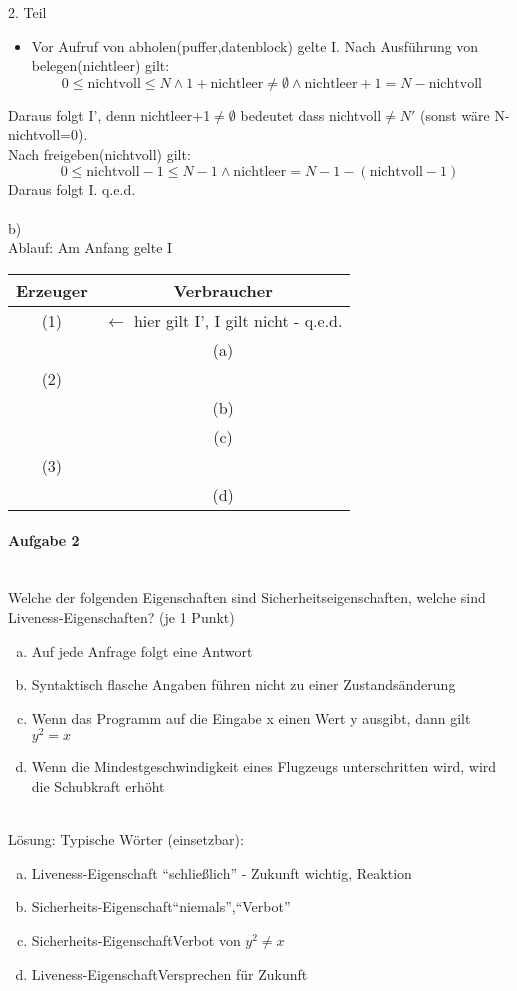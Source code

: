 \documentclass[a4paper,12pt]{scrartcl}
\begin{document}
  2. Teil
  \begin{itemize}
   \item Vor Aufruf von abholen(puffer,datenblock) gelte I. Nach Ausführung von belegen(nichtleer) gilt:
   $$0\leq\text{nichtvoll}\leq N\wedge1+\text{nichtleer}\neq\emptyset\wedge\text{nichtleer}+1=N-\text{nichtvoll} $$
  \end{itemize}
  Daraus folgt I', denn nichtleer+1$\neq\emptyset$ bedeutet dass nichtvoll$\neq N'$ (sonst wäre N-nichtvoll=0).\\
  Nach freigeben(nichtvoll) gilt: 
  $$0\leq \text{nichtvoll}-1\leq N-1\wedge \text{nichtleer}=N-1-(\text{nichtvoll}-1)$$
  Daraus folgt I. q.e.d.\\
  \\
  b)\\
  Ablauf:\hspace{5cm} Am Anfang gelte I\\
  \begin{tabular}{c|c}
  Erzeuger	&	Verbraucher \\\hline
   (1) 	& 	$\leftarrow$ hier gilt I', I gilt nicht - q.e.d.\\
	&	(a) \\
    (2)	&	\\
	&	(b)\\
	&	(c)\\
    (3)	&	\\
	&	(d)
  \end{tabular}

  \paragraph{Aufgabe 2}\quad\\
  Welche der folgenden Eigenschaften sind Sicherheitseigenschaften, welche sind Liveness-Eigenschaften? (je 1 Punkt)
  \begin{enumerate}[a)]
   \item Auf jede Anfrage folgt eine Antwort
   \item Syntaktisch flasche Angaben führen nicht zu einer Zustandsänderung
   \item Wenn das Programm auf die Eingabe x einen Wert y ausgibt, dann gilt $y^2=x$
   \item Wenn die Mindestgeschwindigkeit eines Flugzeugs unterschritten wird, wird die Schubkraft erhöht
  \end{enumerate}
  \quad\\
  Lösung:\hspace{5cm}  Typische Wörter (einsetzbar):
  \begin{enumerate}[a)]
   \item Liveness-Eigenschaft\hspace{2.2cm}  "`schließlich"' - Zukunft wichtig, Reaktion
   \item Sicherheits-Eigenschaft\hspace{2cm}"`niemals"',"`Verbot"'
   \item Sicherheits-Eigenschaft\hspace{2cm}Verbot von $y^2\neq x$
   \item Liveness-Eigenschaft\hspace{2.4cm}Versprechen für Zukunft
  \end{enumerate}
  
\end{document}

